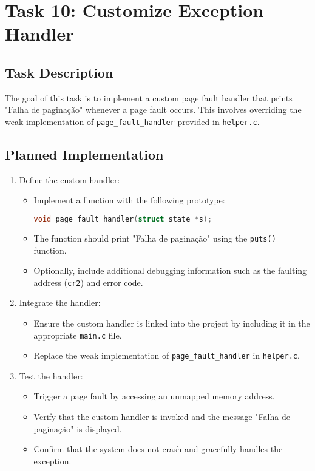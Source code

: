 \documentclass[a4paper,12pt]{report}
\begin{document}
\chapter{Task 10: Customize Exception Handler}

\section{Task Description}
The goal of this task is to implement a custom page fault handler that prints "Falha de paginação" whenever a page fault occurs. This involves overriding the weak implementation of \texttt{page\_fault\_handler} provided in \texttt{helper.c}.

\section{Planned Implementation}
\begin{enumerate}
    \item Define the custom handler:
    \begin{itemize}
        \item Implement a function with the following prototype:
        \begin{lstlisting}[language=C]
        void page_fault_handler(struct state *s);
        \end{lstlisting}
        \item The function should print "Falha de paginação" using the \texttt{puts()} function.
        \item Optionally, include additional debugging information such as the faulting address (\texttt{cr2}) and error code.
    \end{itemize}
    \item Integrate the handler:
    \begin{itemize}
        \item Ensure the custom handler is linked into the project by including it in the appropriate \texttt{main.c} file.
        \item Replace the weak implementation of \texttt{page\_fault\_handler} in \texttt{helper.c}.
    \end{itemize}
    \item Test the handler:
    \begin{itemize}
        \item Trigger a page fault by accessing an unmapped memory address.
        \item Verify that the custom handler is invoked and the message "Falha de paginação" is displayed.
        \item Confirm that the system does not crash and gracefully handles the exception.
    \end{itemize}
\end{enumerate}
\end{document}
